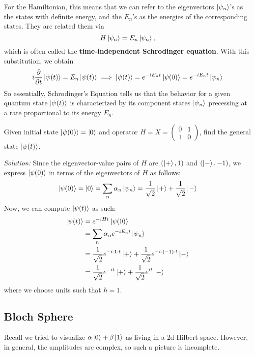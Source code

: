 For the Hamiltonian, this means that we can refer to the eigenvectors $\ket{\psi_n}$'s as the states with definite energy, and the $E_n$'s as the energies of the corresponding states. They are related them via
\[ H \ket{\psi_n} = E_n \ket{\psi_n},\]
which is often called the \textbf{time-independent Schrodinger equation}. With this substitution, we obtain
\[ i \pdv{}{t} \ket{\psi(t)} = E_n \ket{\psi(t)} \implies \ket{\psi(t)} = e^{-i E_n t} \ket{\psi(0)} = e^{-i E_n t} \ket{\psi_n} \]
So essentially, Schrodinger's Equation tells us that the behavior for a given quantum state $\ket{\psi(t)}$ is characterized by its component states $\ket{\psi_n}$ precessing at a rate proportional to its energy $E_n$. 

\begin{example}
    Given initial state $\ket{\psi(0)} = \ket 0$ and operator $H = X = \begin{pmatrix}
        0 & 1 \\
        1 & 0 
    \end{pmatrix}$, find the general state $\ket{\psi(t)}$.

    \emph{Solution:} Since the eigenvector-value pairs of $H$ are $(\ket+, 1)$ and $(\ket-, -1)$, we express $\ket{\psi(0)}$ in terms of the eigenvectors of $H$ as follows:
    \[\ket{\psi(0)} = \ket 0 = \sum_n \alpha_n \ket{\psi_n} = \frac{1}{\sqrt{2}} \ket{+} + \frac{1}{\sqrt{2}} \ket -\]
    Now, we can compute $\ket{\psi(t)}$ as such:
    \begin{align*}
        \ket{\psi(t)} &= e^{-i H t} \ket{\psi(0)} \\
        &= \sum_n \alpha_n e^{-i E_n t} \ket{\psi_n} \\
        &= \frac{1}{\sqrt{2}} e^{-i \cdot 1 \cdot t} \ket{+} + \frac{1}{\sqrt{2}}e^{-i \cdot (-1) \cdot t} \ket - \\
        &= \frac{1}{\sqrt{2}} e^{-it} \ket{+} + \frac{1}{\sqrt{2}}e^{it} \ket -
    \end{align*}
    where we choose units such that $\hbar = 1$.
\end{example}
\subsection{Bloch Sphere}
Recall we tried to visualize $\alpha\ket{0} + \beta\ket{1}$ as living in a 2d Hilbert space. However, in general, the amplitudes are
complex, so such a picture is incomplete.

